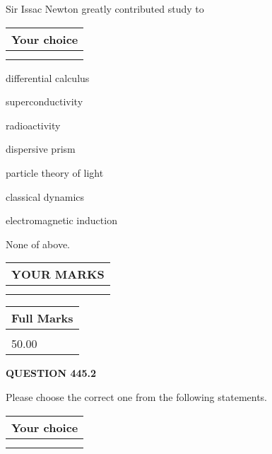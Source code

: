\documentclass[12pt]{article}
\begin{document}
  
Sir Issac Newton greatly contributed study to
  
  
\noindent\hspace{3.0in} \begin{tabular}{|l|}
\hline
Your choice \\
\hline
 \\ 
 \\ 
\hline
\end{tabular}
  
  
 
 
differential calculus
 
 
superconductivity
 
 
radioactivity
 
 
dispersive prism
 
 
particle theory of light
 
 
classical dynamics
 
 
electromagnetic induction
 
 
 None of above.
 
 
  
\vspace{0.2in}
  
\noindent\begin{tabular}{|l|}
\hline
 YOUR MARKS  \\
\hline
 \\ 
 \\ 
\hline
\end{tabular}
\hspace{0.05in} \begin{tabular}{|l|}
\hline
 Full Marks  \\
\hline
 \\ 
50.00 \\
\hline
\end{tabular}
{\textbf{\Large{QUESTION
445.2 
}}}
  
  
Please choose the correct one from the following statements.
  
  
\noindent\hspace{3.0in} \begin{tabular}{|l|}
\hline
Your choice \\
\hline
 \\ 
 \\ 
\hline
\end{tabular}
  
\end{document}

